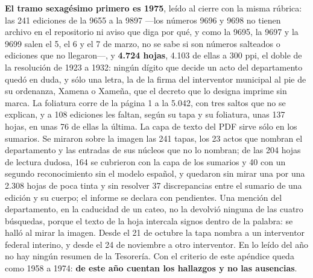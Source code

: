 \textbf{El tramo sexagésimo primero es 1975}, leído al cierre con la misma rúbrica: las 241 ediciones de la 9655 a la 9897 ---los números 9696 y 9698 no tienen archivo en el repositorio ni aviso que diga por qué, y como la 9695, la 9697 y la 9699 salen el 5, el 6 y el 7 de marzo, no se sabe si son números salteados o ediciones que no llegaron---, y \textbf{4.724 hojas}, 4.103 de ellas a 300 ppi, el doble de la resolución de 1923 a 1932: ningún dígito que decide un acto del departamento quedó en duda, y sólo una letra, la de la firma del interventor municipal al pie de su ordenanza, Xamena o Xameña, que el decreto que lo designa imprime sin marca. La foliatura corre de la página 1 a la 5.042, con tres saltos que no se explican, y a 108 ediciones les faltan, según su tapa y su foliatura, unas 137 hojas, en unas 76 de ellas la última. La capa de texto del PDF sirve sólo en los sumarios. Se miraron sobre la imagen las 241 tapas, los 23 actos que nombran el departamento y las entradas de sus núcleos que no lo nombran; de las 204 hojas de lectura dudosa, 164 se cubrieron con la capa de los sumarios y 40 con un segundo reconocimiento sin el modelo español, y quedaron sin mirar una por una 2.308 hojas de poca tinta y sin resolver 37 discrepancias entre el sumario de una edición y su cuerpo; el informe se declara con pendientes. Una mención del departamento, en la caducidad de un cateo, no la devolvió ninguna de las cuatro búsquedas, porque el texto de la hoja intercala signos dentro de la palabra: se halló al mirar la imagen. Desde el 21 de octubre la tapa nombra a un interventor federal interino, y desde el 24 de noviembre a otro interventor. En lo leído del año no hay ningún resumen de la Tesorería. Con el criterio de este apéndice queda como 1958 a 1974: \textbf{de este año cuentan los hallazgos y no las ausencias}.


